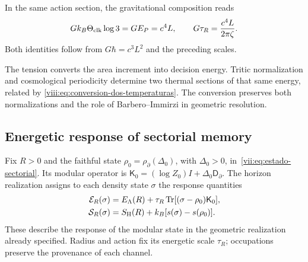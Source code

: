 In the same action section, the gravitational composition reads
\begin{equation}
 Gk_B\Theta_{\rm clk}\log3=GE_P=c^4L,
 \qquad G\tau_R=\frac{c^4L}{2\pi\zeta}.
 \label{viii:eq:composicion-termica-gravitatoria}
\end{equation}
Both identities follow from \(G\hbar=c^3L^2\) and the preceding
scales.

The tension converts the area increment into decision energy.
Tritic normalization and cosmological periodicity determine two thermal
sections of that same energy, related by
\eqref{viii:eq:conversion-dos-temperaturas}. The conversion preserves
both normalizations and the role of Barbero--Immirzi in geometric
resolution.

\subsection{Energetic response of sectorial memory}
\label{viii:subsec:respuesta-energetica-sectorial}

Fix \(R>0\) and the faithful state
\(\rho_0=\rho_\partial(\Delta_0)\), with \(\Delta_0>0\),
in~\eqref{vii:eq:estado-sectorial}. Its modular operator is
\(\mathsf K_0=(\log Z_0)I+\Delta_0\mathsf D_\partial\).
The horizon realization assigns to each density state
\(\sigma\) the response quantities
\begin{equation}
\begin{aligned}
 \mathcal E_R(\sigma)
 &=E_\Lambda(R)+\tau_R
   \operatorname{Tr}[(\sigma-\rho_0)\mathsf K_0],\\
 \mathcal S_R(\sigma)
 &=S_{\rm H}(R)+k_B[s(\sigma)-s(\rho_0)].
\end{aligned}
 \label{viii:eq:respuesta-horizonte-definida}
\end{equation}
These describe the response of the modular state in the geometric
realization already specified. Radius and action fix its energetic
scale \(\tau_R\); occupations preserve the provenance of each channel.

